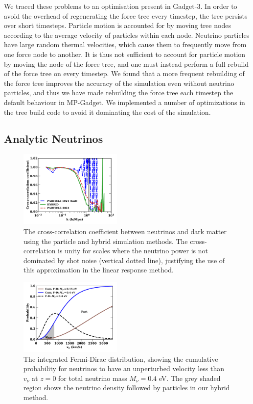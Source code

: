 \documentclass[useAMS, usenatbib]{mnras}
\begin{document}
We traced these problems to an optimisation present in Gadget-3. In order to avoid the overhead of regenerating the force tree every timestep, the tree persists over short timesteps. Particle motion is accounted for by moving tree nodes according to the average velocity of particles within each node. Neutrino particles have large random thermal velocities, which cause them to frequently move from one force node to another. It is thus not sufficient to account for particle motion by moving the node of the force tree, and one must instead perform a full rebuild of the force tree on every timestep. We found that a more frequent rebuilding of the force tree improves the accuracy of the simulation even without neutrino particles, and thus we have made rebuilding the force tree each timestep the default behaviour in MP-Gadget. We implemented a number of optimizations in the tree build code to avoid it dominating the cost of the simulation.

\subsection{Analytic Neutrinos}
\label{sec:analytic}

\begin{figure}
\includegraphics[width=0.45\textwidth]{nuplots/corr_coeff-1.pdf}
  \caption{The cross-correlation coefficient between neutrinos and dark matter using the particle and hybrid simulation methods.
  The cross-correlation is unity for scales where the neutrino power is not dominated by shot noise (vertical dotted line), justifying the use of
  this approximation in the linear response method.
  }
  \label{fig:cross-corr}
\end{figure}

\begin{figure}
\includegraphics[width=0.45\textwidth]{nuplots/fermidirac.pdf}
  \caption{The integrated Fermi-Dirac distribution, showing the cumulative probability for neutrinos to have an unperturbed velocity less than $v_\nu$ at $z=0$ for total neutrino mass $M_\nu = 0.4$ eV.
  The grey shaded region shows the neutrino density followed by particles in our hybrid method.
  }
  \label{fig:fddistribution}
\end{figure}
\end{document}
